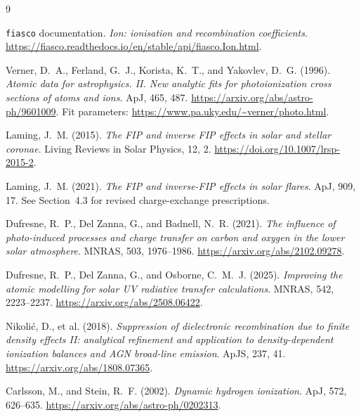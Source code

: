 \begin{thebibliography}{9}

\texttt{fiasco} documentation.
\emph{Ion: ionisation and recombination coefficients}.
\url{https://fiasco.readthedocs.io/en/stable/api/fiasco.Ion.html}.

Verner, D.~A., Ferland, G.~J., Korista, K.~T., and Yakovlev, D.~G. (1996).
\emph{Atomic data for astrophysics. II. New analytic fits for photoionization
cross sections of atoms and ions}.
ApJ, 465, 487.
\url{https://arxiv.org/abs/astro-ph/9601009}.
Fit parameters: \url{https://www.pa.uky.edu/~verner/photo.html}.

Laming, J.~M. (2015).
\emph{The FIP and inverse FIP effects in solar and stellar coronae}.
Living Reviews in Solar Physics, 12, 2.
\url{https://doi.org/10.1007/lrsp-2015-2}.

Laming, J.~M. (2021).
\emph{The FIP and inverse-FIP effects in solar flares}.
ApJ, 909, 17. See Section~4.3 for revised charge-exchange prescriptions.

Dufresne, R.~P., Del Zanna, G., and Badnell, N.~R. (2021).
\emph{The influence of photo-induced processes and charge transfer on carbon
and oxygen in the lower solar atmosphere}.
MNRAS, 503, 1976--1986.
\url{https://arxiv.org/abs/2102.09278}.

Dufresne, R.~P., Del Zanna, G., and Osborne, C.~M.~J. (2025).
\emph{Improving the atomic modelling for solar UV radiative transfer
calculations}.
MNRAS, 542, 2223--2237.
\url{https://arxiv.org/abs/2508.06422}.

Nikoli\'c, D., et al. (2018).
\emph{Suppression of dielectronic recombination due to finite density effects
II: analytical refinement and application to density-dependent ionization
balances and AGN broad-line emission}.
ApJS, 237, 41.
\url{https://arxiv.org/abs/1808.07365}.

Carlsson, M., and Stein, R.~F. (2002).
\emph{Dynamic hydrogen ionization}.
ApJ, 572, 626--635.
\url{https://arxiv.org/abs/astro-ph/0202313}.

\end{thebibliography}

